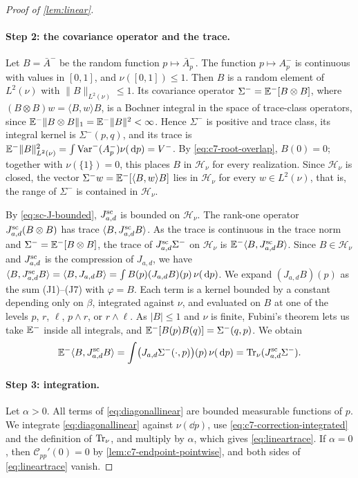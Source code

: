 \begin{proof}[Proof of \cref{lem:linear}]
\paragraph{Step 2: the covariance operator and the trace.}
Let $B=\bar A^-$ be the random function $p\mapsto\bar A_p^-$. The
function $p\mapsto A_p^-$ is continuous with values in $[0,1]$, and
$\nu([0,1])\le1$. Then $B$ is a random element of $L^2(\nu)$ with
$\|B\|_{L^2(\nu)}\le1$. Its covariance operator
$\Sigma^-=\mathbb E^-[B\otimes B]$, where $(B\otimes B)w=\langle B,w\rangle B$,
is a Bochner integral in the space of trace-class operators, since
$\mathbb E^-\|B\otimes B\|_1=\mathbb E^-\|B\|^2<\infty$. Hence $\Sigma^-$ is positive
and trace class, its integral kernel is $\Sigma^-(p,q)$, and its trace
is $\mathbb E^-\|B\|^2_{L^2(\nu)}=\int\operatorname{Var}^-(A_p^-)\nu(\,\mathrm d p)=V^-$. By
\eqref{eq:c7-root-overlap}, $B(0)=0$; together with $\nu(\{1\})=0$,
this places $B$ in $\mathcal H_\nu$ for every realization. Since
$\mathcal H_\nu$ is closed, the vector
$\Sigma^-w=\mathbb E^-[\langle B,w\rangle B]$ lies in $\mathcal H_\nu$ for
every $w\in L^2(\nu)$, that is, the range of $\Sigma^-$ is contained in
$\mathcal H_\nu$.

By \eqref{eq:sc-J-bounded}, $J^{\mathrm{sc}}_{a,d}$ is bounded on
$\mathcal H_\nu$. The rank-one operator $J^{\mathrm{sc}}_{a,d}(B\otimes B)$
has trace $\langle B,J^{\mathrm{sc}}_{a,d}B\rangle$. As the trace is
continuous in the trace norm and $\Sigma^-=\mathbb E^-[B\otimes B]$, the trace
of $J^{\mathrm{sc}}_{a,d}\Sigma^-$ on $\mathcal H_\nu$ is
$\mathbb E^-\langle B,J^{\mathrm{sc}}_{a,d}B\rangle$. Since $B\in\mathcal H_\nu$
and $J^{\mathrm{sc}}_{a,d}$ is the compression of $J_{a,d}$, we have
$\langle B,J^{\mathrm{sc}}_{a,d}B\rangle=\langle B,J_{a,d}B\rangle
=\int B(p)(J_{a,d}B)(p)\,\nu(\,\mathrm d p)$. We expand $(J_{a,d}B)(p)$ as the
sum (J1)--(J7) with $\varphi=B$. Each term is a kernel bounded by a
constant depending only on $\beta$, integrated against $\nu$, and
evaluated on $B$ at one of the levels $p$, $r$, $\ell$, $p\wedge r$,
or $r\wedge\ell$. As $|B|\le1$ and $\nu$ is finite, Fubini's theorem
lets us take $\mathbb E^-$ inside all integrals, and
$\mathbb E^-[B(p)B(q)]=\Sigma^-(q,p)$. We obtain
\[
 \mathbb E^-\langle B,J^{\mathrm{sc}}_{a,d}B\rangle
 =\int\bigl(J_{a,d}\Sigma^-(\cdot,p)\bigr)(p)\,\nu(\,\mathrm d p)
 =\operatorname{Tr}_\nu(J^{\mathrm{sc}}_{a,d}\Sigma^-).
\]

\paragraph{Step 3: integration.}
Let $\alpha>0$. All terms of \eqref{eq:diagonallinear} are bounded
measurable functions of $p$. We integrate \eqref{eq:diagonallinear}
against $\nu(\dd p)$, use \eqref{eq:c7-correction-integrated} and the
definition of $\operatorname{Tr}_\nu$, and multiply by $\alpha$, which gives
\eqref{eq:lineartrace}. If $\alpha=0$, then $\mathcal C_{pp}'(0)=0$ by
\cref{lem:c7-endpoint-pointwise}, and both sides of
\eqref{eq:lineartrace} vanish.
\end{proof}

